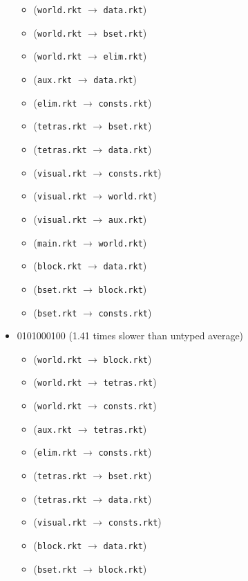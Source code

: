 \documentclass{article}
\newcommand{\mono}[1]{\texttt{#1}}
\begin{document}
\begin{itemize}
  \begin{itemize}
  \item (\mono{world.rkt} $\rightarrow$ \mono{data.rkt})
  \item (\mono{world.rkt} $\rightarrow$ \mono{bset.rkt})
  \item (\mono{world.rkt} $\rightarrow$ \mono{elim.rkt})
  \item (\mono{aux.rkt} $\rightarrow$ \mono{data.rkt})
  \item (\mono{elim.rkt} $\rightarrow$ \mono{consts.rkt})
  \item (\mono{tetras.rkt} $\rightarrow$ \mono{bset.rkt})
  \item (\mono{tetras.rkt} $\rightarrow$ \mono{data.rkt})
  \item (\mono{visual.rkt} $\rightarrow$ \mono{consts.rkt})
  \item (\mono{visual.rkt} $\rightarrow$ \mono{world.rkt})
  \item (\mono{visual.rkt} $\rightarrow$ \mono{aux.rkt})
  \item (\mono{main.rkt} $\rightarrow$ \mono{world.rkt})
  \item (\mono{block.rkt} $\rightarrow$ \mono{data.rkt})
  \item (\mono{bset.rkt} $\rightarrow$ \mono{block.rkt})
  \item (\mono{bset.rkt} $\rightarrow$ \mono{consts.rkt})
  \end{itemize}
\item 0101000100 (1.41 times slower than untyped average)
  \begin{itemize}
  \item (\mono{world.rkt} $\rightarrow$ \mono{block.rkt})
  \item (\mono{world.rkt} $\rightarrow$ \mono{tetras.rkt})
  \item (\mono{world.rkt} $\rightarrow$ \mono{consts.rkt})
  \item (\mono{aux.rkt} $\rightarrow$ \mono{tetras.rkt})
  \item (\mono{elim.rkt} $\rightarrow$ \mono{consts.rkt})
  \item (\mono{tetras.rkt} $\rightarrow$ \mono{bset.rkt})
  \item (\mono{tetras.rkt} $\rightarrow$ \mono{data.rkt})
  \item (\mono{visual.rkt} $\rightarrow$ \mono{consts.rkt})
  \item (\mono{block.rkt} $\rightarrow$ \mono{data.rkt})
  \item (\mono{bset.rkt} $\rightarrow$ \mono{block.rkt})

\end{itemize}
\end{itemize}
\end{document}
